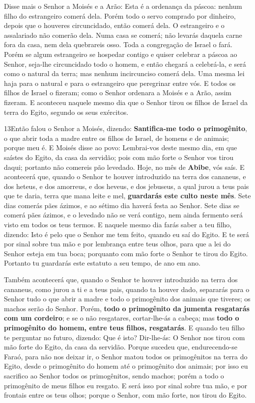 Disse mais o Senhor a Moisés e a Arão: Esta é a ordenança da
páscoa: nenhum filho do estrangeiro comerá dela. Porém todo o
servo comprado por dinheiro, depois que o houveres circuncidado,
então comerá dela. O estrangeiro e o assalariado não comerão
dela. Numa casa se comerá; não levarás daquela carne fora da
casa, nem dela quebrareis osso. Toda a congregação de Israel
o fará. Porém se algum estrangeiro se hospedar contigo e
quiser celebrar a páscoa ao Senhor, seja-lhe circuncidado todo o
homem, e então chegará a celebrá-la, e será como o natural da terra;
mas nenhum incircunciso comerá dela. Uma mesma lei haja para
o natural e para o estrangeiro que peregrinar entre vós. E
todos os filhos de Israel o fizeram; como o Senhor ordenara a Moisés
e a Arão, assim fizeram. E aconteceu naquele mesmo dia que o
Senhor tirou os filhos de Israel da terra do Egito, segundo os seus
exércitos.

\medskip

\lettrine{13} Então falou o Senhor a Moisés, dizendo:
\textbf{Santifica-me todo o primogênito}, o que abrir toda a
madre entre os filhos de Israel, de homens e de animais; porque meu
é. E Moisés disse ao povo: Lembrai-vos deste mesmo dia, em que
saístes do Egito, da casa da servidão; pois com mão forte o Senhor
vos tirou daqui; portanto não comereis pão levedado. Hoje, no
mês de \textbf{Abibe}, vós saís. E acontecerá que, quando o
Senhor te houver introduzido na terra dos cananeus, e dos heteus, e
dos amorreus, e dos heveus, e dos jebuseus, a qual jurou a teus pais
que te daria, terra que mana leite e mel, \textbf{guardarás este
culto neste mês}. Sete dias comerás pães ázimos, e ao sétimo dia
haverá festa ao Senhor. Sete dias se comerá pães ázimos, e o
levedado não se verá contigo, nem ainda fermento será visto em todos
os teus termos. E naquele mesmo dia farás saber a teu filho,
dizendo: Isto é pelo que o Senhor me tem feito, quando eu saí do
Egito. E te será por sinal sobre tua mão e por lembrança entre
teus olhos, para que a lei do Senhor esteja em tua boca; porquanto
com mão forte o Senhor te tirou do Egito. Portanto tu
guardarás este estatuto a seu tempo, de ano em ano.

Também acontecerá que, quando o Senhor te houver introduzido na
terra dos cananeus, como jurou a ti e a teus pais, quando ta houver
dado, separarás para o Senhor tudo o que abrir a madre e todo
o primogênito dos animais que tiveres; os machos serão do Senhor.
Porém, \textbf{todo o primogênito da jumenta resgatarás com
um cordeiro}; e se o não resgatares, cortar-lhe-ás a cabeça; mas
\textbf{todo o primogênito do homem, entre teus filhos, resgatarás}.
E quando teu filho te perguntar no futuro, dizendo: Que é
isto? Dir-lhe-ás: O Senhor nos tirou com mão forte do Egito, da casa
da servidão. Porque sucedeu que, endurecendo-se Faraó, para
não nos deixar ir, o Senhor matou todos os primogênitos na terra do
Egito, desde o primogênito do homem até o primogênito dos animais;
por isso eu sacrifico ao Senhor todos os primogênitos, sendo machos;
porém a todo o primogênito de meus filhos eu resgato. E será
isso por sinal sobre tua mão, e por frontais entre os teus olhos;
porque o Senhor, com mão forte, nos tirou do Egito.

